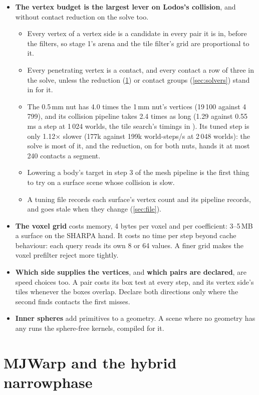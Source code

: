 \begin{itemize}
\item \textbf{The vertex budget is the largest lever on Lodos's collision}, and without contact reduction on the solve too.
  \begin{itemize}
  \item Every vertex of a vertex side is a candidate in every pair it is in, before the filters, so stage 1's arena and the tile filter's grid are proportional to it.
  \item Every penetrating vertex is a contact, and every contact a row of three in the solve, unless the reduction (\cref{sec:mjw}) or contact groups (\cref{sec:solvers}) stand in for it.
  \item The 0.5\,mm nut has 4.0 times the 1\,mm nut's vertices (19\,100 against 4\,799), and its collision pipeline takes 2.4 times as long (1.29 against 0.55\,ms a step at 1\,024 worlds, the tile search's timings in ). Its tuned step is only 1.12$\times$ slower (177k against 199k world-steps/s at 2\,048 worlds): the solve is most of it, and the reduction, on for both nuts, hands it at most 240 contacts a segment.
  \item Lowering a body's target in step 3 of the mesh pipeline is the first thing to try on a surface scene whose collision is slow.
  \item A tuning file records each surface's vertex count and its pipeline records, and goes stale when they change (\cref{sec:file}).
  \end{itemize}
\item \textbf{The voxel grid} costs memory, 4 bytes per voxel and per coefficient: 3--5\,MB a surface on the SHARPA hand. It costs no time per step beyond cache behaviour: each query reads its own 8 or 64 values. A finer grid makes the voxel prefilter reject more tightly.
\item \textbf{Which side supplies the vertices}, and \textbf{which pairs are declared}, are speed choices too. A pair costs its box test at every step, and its vertex side's tiles whenever the boxes overlap. Declare both directions only where the second finds contacts the first misses.
\item \textbf{Inner spheres} add primitives to a geometry. A scene where no geometry has any runs the sphere-free kernels, compiled for it.
\end{itemize}

\section{MJWarp and the hybrid narrowphase}\label{sec:mjw}

